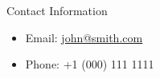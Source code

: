 \documentclass[final,hyperref={pdfpagelabels=false}]{beamer}
\begin{document}
\begin{frame}[t]
\begin{columns}[t]
\begin{column}{.465\textwidth}
\begin{block}{Contact Information}
\begin{itemize}

\item Email: \href{mailto:john@smith.com}{john@smith.com}
\item Phone: +1 (000) 111 1111
\end{itemize}

\end{block}


\end{column} %

\begin{column}{.015\textwidth}\end{column} %

\end{columns} %

\end{frame} %
\end{document}
